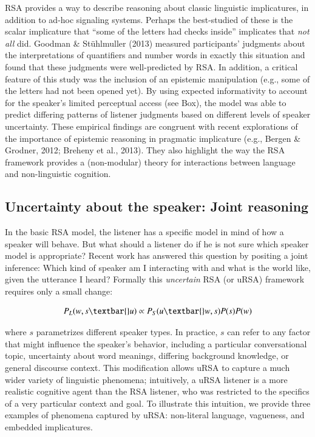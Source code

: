 \documentclass[]{elsarticle}
\begin{document}
RSA provides a way to describe reasoning about classic linguistic
implicatures, in addition to ad-hoc signaling systems. Perhaps the
best-studied of these is the scalar implicature that ``some of the
letters had checks inside'' implicates that \emph{not all} did. Goodman
\& Stühlmuller (2013) measured participants' judgments about the
interpretations of quantifiers and number words in exactly this
situation and found that these judgments were well-predicted by RSA. In
addition, a critical feature of this study was the inclusion of an
epistemic manipulation (e.g., some of the letters had not been opened
yet). By using expected informativity to account for the speaker's
limited perceptual access (see Box), the model was able to predict
differing patterns of listener judgments based on different levels of
speaker uncertainty. These empirical findings are congruent with recent
explorations of the importance of epistemic reasoning in pragmatic
implicature (e.g., Bergen \& Grodner, 2012; Breheny et al., 2013). They
also highlight the way the RSA framework provides a (non-modular) theory
for interactions between language and non-linguistic cognition.

\subsection{Uncertainty about the speaker: Joint
reasoning}\label{uncertainty-about-the-speaker-joint-reasoning}

In the basic RSA model, the listener has a specific model in mind of how
a speaker will behave. But what should a listener do if he is not sure
which speaker model is appropriate? Recent work has answered this
question by positing a joint inference: Which kind of speaker am I
interacting with and what is the world like, given the utterance I
heard? Formally this \emph{uncertain} RSA (or uRSA) framework requires
only a small change:

$$P_L(w,s\textbar{}u) \propto
P_S(u\textbar{}w,s)P(s)P(w)$$

where $s$ parametrizes different speaker types. In practice, $s$ can
refer to any factor that might influence the speaker's behavior,
including a particular conversational topic, uncertainty about word
meanings, differing background knowledge, or general discourse context.
This modification allows uRSA to capture a much wider variety of
linguistic phenomena; intuitively, a uRSA listener is a more realistic
cognitive agent than the RSA listener, who was restricted to the
specifics of a very particular context and goal. To illustrate this
intuition, we provide three examples of phenomena captured by uRSA:
non-literal language, vagueness, and embedded implicatures.
\end{document}
